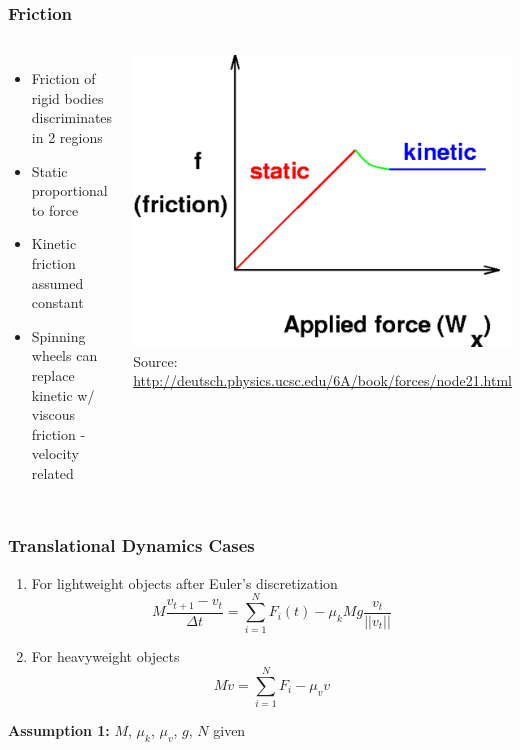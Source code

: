 \documentclass{beamer}
\begin{document}
\begin{frame}
\frametitle{Friction}

\begin{columns}[c] 
\begin{itemize}
\item Friction of rigid bodies discriminates in 2 regions \vspace{0.2cm}
\item Static proportional to force \vspace{0.2cm}
\item Kinetic friction assumed constant \vspace{0.2cm}
\item Spinning wheels can replace kinetic w/ viscous friction - velocity related
\end{itemize}

\centering
 \includegraphics[width=.8\textwidth]{figures/Static_Vs_Kinetic.png}\\
\scriptsize{Source: \url{http://deutsch.physics.ucsc.edu/6A/book/forces/node21.html}}
\end{columns}

\end{frame}

\begin{frame}
\frametitle{Translational Dynamics Cases}
\begin{enumerate}
\item For lightweight objects after Euler's discretization
\begin{equation}\label{dod}
M\frac{v_{t+1}-v_t}{\Delta t}=\sum_{i=1}^N F_i(t)-\mu_kMg\frac{v_t}{||v_t||}
\end{equation}
\item For heavyweight objects
\begin{equation}\label{roldyn}
M\dot{v}=\sum_{i=1}^N F_i-\mu_v v
\end{equation}
\end{enumerate}
\textbf{Assumption 1:} $M$, $\mu_k$, $\mu_v$, $g$, $N$ given
\end{frame}
\end{document}
